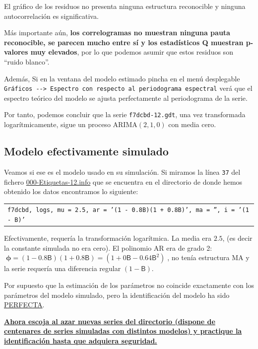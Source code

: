 \documentclass[10pt]{article}
\begin{document}
El gráfico de los residuos no presenta ninguna estructura reconocible y ninguna autocorrelación es significativa. 

Más importante aún, \textbf{los correlogramas no muestran ninguna pauta
reconocible, se parecen mucho entre sí y los estadísticos Q muestran
p-valores muy elevados}, por lo que podemos asumir que estos residuos
son ``ruido blanco''.
\medskip

Además, Si en la ventana del modelo estimado pincha en el menú
desplegable \texttt{Gráficos -{}-{}> Espectro con respecto al periodograma
espectral} verá que el espectro teórico del modelo se ajusta
perfectamente al periodograma de la serie.
\medskip

Por tanto, podemos concluir que la serie \texttt{f7dcbd-12.gdt}, una vez
transformada logarítmicamente, sigue un proceso ARIMA\((2,1,0)\) con
media cero. 
\subsection*{Modelo efectivamente simulado}
\label{sec:orgfa8f8c7}

Veamos si ese es el modelo usado en su simulación. Si miramos la línea
\texttt{37} del fichero \href{IdentificaEstosARIMA/000-Etiquetas-12.info}{000-Etiquetas-12.info} que se encuentra en el directorio de
donde hemos obtenido los datos encontramos lo siguiente:
\medskip

\begin{center}
\begin{tabular}{l}
\texttt{f7dcbd,	logs,	mu = 2.5,	ar = '(1 - 0.8B)(1 + 0.8B)', ma = '', i = '(1 - B)'}\\
\end{tabular}
\end{center}

\medskip

Efectivamente, requería la transformación logarítmica. La media era
\(2.5\), (es decir la constante simulada no era cero). El polinomio AR
era de grado 2: \(\;\boldsymbol{\phi}=(1 - 0.8\mathsf{B})(1 +
0.8\mathsf{B})=(1+0\mathsf{B}-0.64\mathsf{B}^2)\;\), no tenía
estructura MA y la serie requería una diferencia regular \((1 -
\mathsf{B})\).
\bigskip

Por supuesto que la estimación de los parámetros no coincide
exactamente con los parámetros del modelo simulado, pero la
identificación del modelo ha sido \uline{PERFECTA}.
\bigskip


\textbf{\uline{Ahora escoja al azar nuevas series del \href{https://github.com/mbujosab/EconometriaAplicada-SRC/tree/main/Ejercicios/IdentificaEstosARIMA}{directorio} (dispone de
 centenares de series simuladas con distintos modelos) y practique la
 identificación hasta que adquiera seguridad.}}
\end{document}
